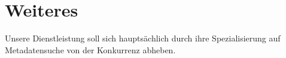 \chapter{Weiteres}

Unsere Dienstleistung soll sich hauptsächlich durch ihre Spezialisierung auf
Metadatensuche von der Konkurrenz abheben. 
